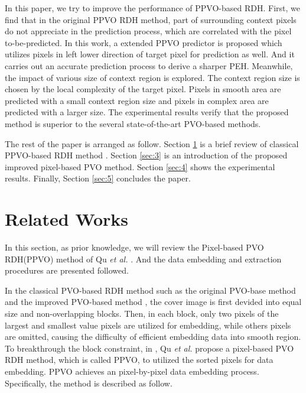 \documentclass[review,3p,10pt,sort&compress]{elsarticle}
\begin{document}
In this paper, we try to improve the performance of PPVO-based RDH. First, we find that in the original PPVO RDH method, part of surrounding context pixels do not appreciate in the prediction process, which are correlated with the pixel to-be-predicted. In this work, a extended PPVO predictor is proposed which utilizes pixels in left lower direction of target pixel for prediction as well. And it carries out an accurate prediction process to derive a sharper PEH. Meanwhile, the impact of various size of context region is explored. The context region size is chosen by the local complexity of the target pixel. Pixels in smooth area are predicted with a small context region size and pixels in complex area are predicted with a larger size. The experimental results verify that the proposed method is superior to the several state-of-the-art PVO-based methods.

The rest of the paper is arranged as follow. Section \ref{sec:2} is a brief review of classical PPVO-based RDH method \cite{Qu2015PPVO}. Section \ref{sec:3} is an introduction of the proposed improved pixel-based PVO method. Section \ref{sec:4} shows the experimental results. Finally, Section \ref{sec:5} concludes the paper.

\section{Related Works}\label{sec:2}
In this section, as prior knowledge, we will review the Pixel-based PVO RDH(PPVO) method of Qu \emph{et al.} \cite{Qu2015PPVO}. And the data embedding and extraction procedures are presented followed.

In the classical PVO-based RDH method such as the original PVO-base method \cite{Li2013PVO} and the improved PVO-based method \cite{Peng2014IPVO}, the cover image is first devided into equal size and non-overlapping blocks. Then, in each block, only two pixels of the largest and smallest value pixels are utilized for embedding, while others pixels are omitted, causing the difficulty of efficient embedding data into smooth region. To breakthrough the block constraint, in \cite{Qu2015PPVO}, Qu \emph{et al.} propose a pixel-based PVO RDH method, which is called PPVO, to utilized the sorted pixels for data embedding. PPVO achieves an pixel-by-pixel data embedding process. Specifically, the method is described as follow.
\end{document}
